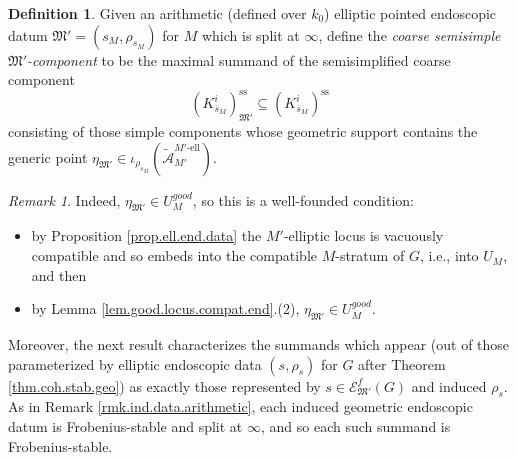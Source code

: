 \documentclass[openany]{amsbook}
\theoremstyle{definition}
\newtheorem{definition}[theorem]{Definition}
\theoremstyle{remark}
\newtheorem{remark}[theorem]{Remark}
\numberwithin{equation}{section}
\newcommand{\cA}{\mathcal{A}}
\newcommand{\cE}{\mathcal{E}}
\newcommand{\ol}[1]{\overline{#1}}
\renewcommand{\-}{\operatorname{-}}
\newcommand{\good}{\mathit{good}}
\newcommand{\el}{\text{-ell}}
\newcommand{\ctA}{\widetilde{\cA}}
\newcommand{\fM}{\mathfrak{M}}
\renewcommand{\ss}{\mathrm{ss}}
\begin{document}
\begin{definition}\label{def.fM'.cpt}
    Given an arithmetic (defined over $k_0$) elliptic pointed endoscopic datum $\fM' = (s_M, \rho_{s_M})$ for $M$ which is split at $\infty$, define the \emph{coarse semisimple $\fM'$-component} to be the maximal summand of the semisimplified coarse component
    $$
        (K_{\ol{s}_M}^i)^{\ss}_{\fM'} \subseteq (K_{\ol{s}_M}^i)^{\ss}
    $$
    consisting of those simple components whose geometric support contains the generic point $\eta_{\fM'} \in \iota_{\rho_{s_M}}(\ctA_{M'}^{M'\el})$.   
\end{definition}

\begin{remark}
    Indeed, $\eta_{\fM'} \in U_M^{\good}$, so this is a well-founded condition:
    \begin{itemize} 
    \item by Proposition \ref{prop.ell.end.data} the $M'$-elliptic locus is vacuously compatible and so embeds into the compatible $M$-stratum of $G$, i.e., into $U_M$, and then
    \item by Lemma \ref{lem.good.locus.compat.end}.(2), $\eta_{\fM'} \in U_M^{\good}$.
    \end{itemize}
\end{remark}

Moreover, the next result characterizes the summands which appear (out of those parameterized by elliptic endoscopic data $(s, \rho_s)$ for $G$ after Theorem \ref{thm.coh.stab.geo}) as exactly those represented by $s \in \cE_{\fM'}^f(G)$ and induced $\rho_s$. As in Remark \ref{rmk.ind.data.arithmetic}, each induced geometric endoscopic datum is Frobenius-stable and split at $\infty$, and so each such summand is Frobenius-stable.
\end{document}
